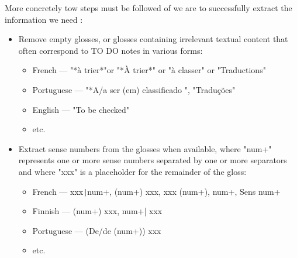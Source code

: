 \documentclass[10pt, a4paper]{article}
\begin{document}
More concretely tow steps must be followed of we are to successfully extract the information we need :
\begin{itemize}
   \item Remove empty glosses, or glosses containing irrelevant textual content that often correspond to TO DO notes in various forms:
   \begin{itemize}
      \item French --- "*à trier*"or "*À trier*" or "à classer" or "Traductions"
      \item Portuguese --- "*A/a ser (em) classificado ", "Traduções"
      \item English --- "To be checked"
      \item etc.
   \end{itemize}
   \item Extract sense numbers from the glosses when available, where "num+" represents one or more sense numbers separated by one or more separators and where "xxx" is a placeholder for the remainder of the gloss: 
   \begin{itemize}
      \item French --- xxx\texttt{|}num+, (num+) xxx, xxx (num+), num+, Sens num+
      \item Finnish --- (num+) xxx, num+| xxx
      \item Portuguese --- (De/de (num+)) xxx
      \item etc.
   \end{itemize}
\end{itemize}
\end{document}
